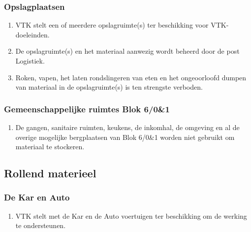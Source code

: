     \subsubsection{Opslagplaatsen}\label{art:kelder}
    \begin{enumerate}
    \item VTK stelt een of meerdere opslagruimte(s) ter beschikking voor VTK-doeleinden.
    \item De opslagruimte(s) en het materiaal aanwezig wordt beheerd door de post Logistiek.
    \item Roken, vapen, het laten rondslingeren van eten en het ongeoorloofd dumpen van materiaal in de opslagruimte(s) is ten strengste verboden.
    \end{enumerate}

    \subsubsection{Gemeenschappelijke ruimtes Blok 6/0\&1}\label{art:blok6}
    \begin{enumerate}
    \item De gangen, sanitaire ruimten, keukens, de inkomhal, de omgeving en al de overige mogelijke bergplaatsen van Blok 6/0\&1 worden niet gebruikt om materiaal te stockeren.
    \end{enumerate}


\subsection{Rollend materieel}

    \subsubsection{De Kar en Auto}
    \begin{enumerate}
    \item VTK stelt met de Kar en de Auto voertuigen ter beschikking om de werking te ondersteunen.
    \end{enumerate}

